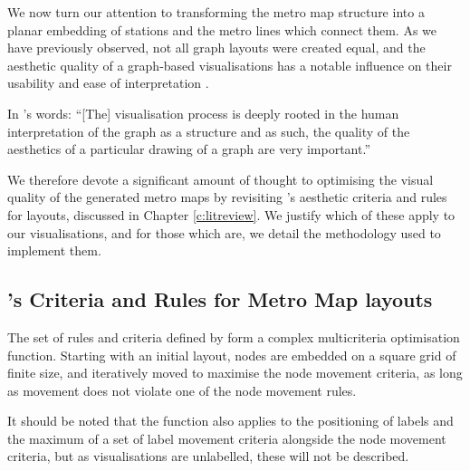 We now turn our attention to transforming the metro map structure into a planar embedding of stations and the metro lines which connect them. As we have previously observed, not all graph layouts were created equal, and the aesthetic quality of a graph-based visualisations has a notable influence on their usability and ease of interpretation \citep{TheBasisForGraphDrawingAlgorithms, WhichAesthetic, AutomaticMetroMapLayoutThesis, AutomaticMetroMapLayout}. 

In \citeauthor{AutomaticMetroMapLayoutThesis}'s words: ``[The] visualisation process is deeply rooted in the human interpretation of the graph as a structure and as such, the quality of the aesthetics of a particular drawing of a graph are very important.'' \citep[p.24]{AutomaticMetroMapLayoutThesis}

We therefore devote a significant amount of thought to optimising the visual quality of the generated metro maps by revisiting \citeauthor{AutomaticMetroMapLayoutThesis}'s aesthetic criteria and rules for layouts, discussed in Chapter \ref{c:litreview}. We justify which of these apply to our visualisations, and for those which are, we detail the methodology used to implement them.

\subsection{\citeauthor{AutomaticMetroMapLayoutThesis}'s Criteria and Rules for Metro Map layouts}

The set of rules and criteria defined by \cite{AutomaticMetroMapLayoutThesis} form a complex multicriteria optimisation function. Starting with an initial layout, nodes are embedded on a square grid of finite size, and iteratively moved to maximise the node movement criteria, as long as movement does not violate one of the node movement rules.

It should be noted that the function also applies to the positioning of labels and the maximum of a set of label movement criteria alongside the node movement criteria, but as visualisations are unlabelled, these will not be described.

